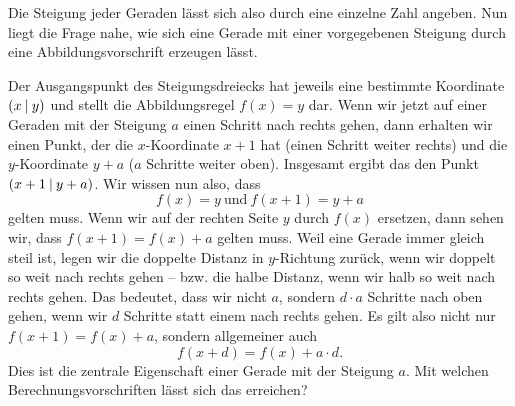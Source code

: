 \documentclass[../../main.tex]{subfiles}
\begin{document}
Die Steigung jeder Geraden lässt sich also durch eine einzelne Zahl angeben. Nun liegt die Frage nahe, wie sich eine Gerade mit einer vorgegebenen Steigung durch eine Abbildungsvorschrift erzeugen lässt. 


Der Ausgangspunkt des Steigungsdreiecks hat jeweils eine bestimmte Koordinate $\left(x \:\middle|\: y\right)$ und stellt die Abbildungsregel $f(x)=y$ dar. Wenn wir jetzt auf einer Geraden mit der Steigung $a$ einen Schritt nach rechts gehen, dann erhalten wir einen Punkt, der die $x$-Koordinate $x+1$ hat (einen Schritt weiter rechts) und die $y$-Koordinate $y+a$ ($a$ Schritte weiter oben). Insgesamt ergibt das den Punkt $\left(x+1 \:\middle|\: y+a\right)$. Wir wissen nun also, dass
\[f(x)=y~\text{und}~f(x+1)=y+a\]
gelten muss. Wenn wir auf der rechten Seite $y$ durch $f(x)$ ersetzen, dann sehen wir, dass $f(x+1)=f(x)+a$ gelten muss. Weil eine Gerade immer gleich steil ist, legen wir die doppelte Distanz in $y$-Richtung zurück, wenn wir doppelt so weit nach rechts gehen -- bzw. die halbe Distanz, wenn wir halb so weit nach rechts gehen. Das bedeutet, dass wir nicht $a$, sondern $d\cdot a$ Schritte nach oben gehen, wenn wir $d$ Schritte statt einem nach rechts gehen. Es gilt also nicht nur $f(x+1)=f(x)+a$, sondern allgemeiner auch 
\[f(x+d)=f(x)+a\cdot d.\] Dies ist die zentrale Eigenschaft einer Gerade mit der Steigung $a$. Mit welchen Berechnungsvorschriften lässt sich das erreichen?
\end{document}

